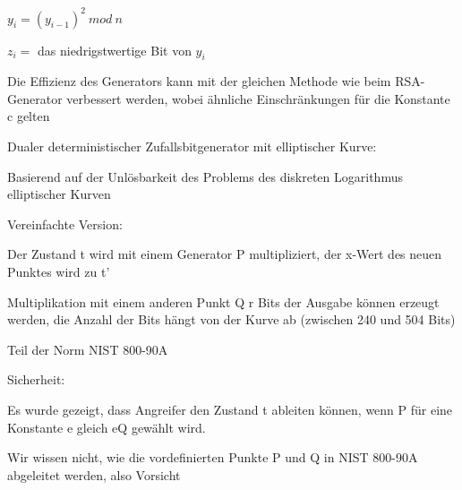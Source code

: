\documentclass[a4paper]{article}
\begin{document}
\begin{multicols}{3}
\begin{itemize*}
\begin{enumerate*}
                  \begin{enumerate*}
                        \item $y_i = (y_{i-1})^2\ mod\ n$
                        \item $z_i =$ das niedrigstwertige Bit von $y_i$
                  \end{enumerate*}
            \end{enumerate*}
            \begin{itemize*}
                  \item Die Effizienz des Generators kann mit der gleichen Methode wie beim RSA-Generator verbessert werden, wobei ähnliche Einschränkungen für die Konstante c gelten
            \end{itemize*}
            \item Dualer deterministischer Zufallsbitgenerator mit elliptischer Kurve:
            \begin{itemize*}
                  \item Basierend auf der Unlösbarkeit des Problems des diskreten Logarithmus elliptischer Kurven
                  \item Vereinfachte Version: %
                  \item Der Zustand t wird mit einem Generator P multipliziert, der x-Wert des neuen Punktes wird zu t'
                  \item Multiplikation mit einem anderen Punkt Q r Bits der Ausgabe können erzeugt werden, die Anzahl der Bits hängt von der Kurve ab (zwischen 240 und 504 Bits)
                  \item Teil der Norm NIST 800-90A
                  \item Sicherheit:
                  \begin{itemize*}
                        \item Es wurde gezeigt, dass Angreifer den Zustand t ableiten können, wenn P für eine Konstante e gleich eQ gewählt wird.
                        \item Wir wissen nicht, wie die vordefinierten Punkte P und Q in NIST 800-90A abgeleitet werden, also Vorsicht
                  \end{itemize*}
            \end{itemize*}
      \end{itemize*}


\end{multicols}
\end{document}
